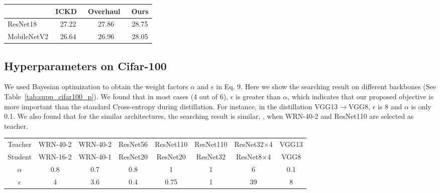 \documentclass[10pt,onecolumn,letterpaper]{article}
\begin{document}
\begin{table*}[h]
    \centering
    \caption{Comparison (mIoU\%) on COCOStuff10k.}
    \begin{tabular}{l|ccc}
    \toprule
         &ICKD~\cite{Liu2021ICKD} &Overhaul~\cite{Heo2019ACO} &Ours  \\ \midrule
        ResNet18 &27.22 &27.86 &28.75 \\   \midrule
        MobileNetV2 &26.64 &26.96 &28.05 \\
    \bottomrule
    \end{tabular}
    \label{tab:supp_seg}
\end{table*}



\subsection{Hyperparameters on Cifar-100}
We used Bayesian optimization to obtain the weight factors $\alpha$ and $\epsilon$ in Eq. 9. Here we show the searching result on different backbones (See Table~\ref{tab:supp_cifar100_p}). We found that in most cases (4 out of 6), $\epsilon$ is greater than $\alpha$, which indicates that our proposed objective is more important than the standard Cross-entropy during distillation. For instance, in the distillation VGG13$\rightarrow$VGG8, $\epsilon$ is 8 and $\alpha$ is only 0.1. We also found that for the similar architectures, the searching result is similar, \eg, when WRN-40-2 and ResNet110 are selected as teacher.


\begin{table*}[]
    \centering
    \caption{Coefficients $\alpha$ and $\epsilon$ on different backbones on Cifar-100.}
    \vspace{0mm}
    \begin{tabular}{c|ccccccc}
    \toprule
        Teacher & WRN-40-2 & WRN-40-2  & ResNet56 & ResNet110 & ResNet110 & ResNet32$\times$4 & VGG13 \\
        Student & WRN-16-2 & WRN-40-1  & ResNet20 & ResNet20  & ResNet32  & ResNet8$\times$4  & VGG8 \\ \midrule 
        $\alpha$   &0.8 &0.7 &0.8 &1 &1 &6 &0.1\\
        $\epsilon$ &4 &3.6 &0.4 &0.75 &1 &39 &8\\
        \bottomrule
         
    \end{tabular}
    \label{tab:supp_cifar100_p}
\end{table*}
\end{document}
